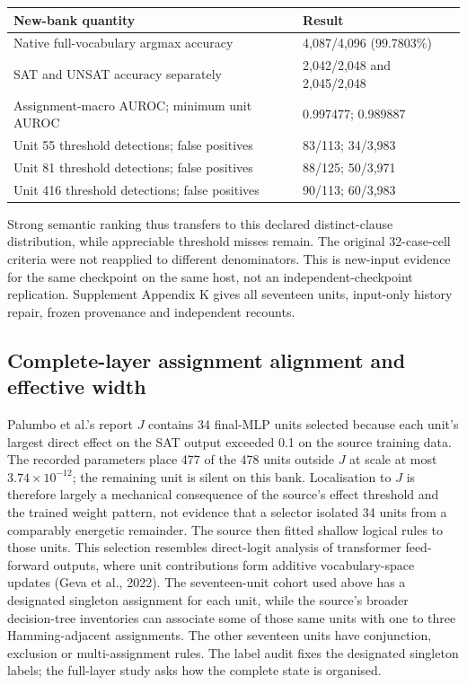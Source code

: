 \documentclass[
  british,
  11pt,
  a4paper,
]{article}
\newcounter{none} %
\begin{document}
{\def\LTcaptype{none} %
\begin{longtable}[]{@{}ll@{}}
\toprule\noalign{}
New-bank quantity & Result \\
\midrule\noalign{}
\endhead
\bottomrule\noalign{}
\endlastfoot
Native full-vocabulary argmax accuracy & 4,087/4,096 (99.7803\%) \\
SAT and UNSAT accuracy separately & 2,042/2,048 and 2,045/2,048 \\
Assignment-macro AUROC; minimum unit AUROC & 0.997477; 0.989887 \\
Unit 55 threshold detections; false positives & 83/113; 34/3,983 \\
Unit 81 threshold detections; false positives & 88/125; 50/3,971 \\
Unit 416 threshold detections; false positives & 90/113; 60/3,983 \\
\end{longtable}
}

Strong semantic ranking thus transfers to this declared distinct-clause
distribution, while appreciable threshold misses remain. The original
32-case-cell criteria were not reapplied to different denominators. This
is new-input evidence for the same checkpoint on the same host, not an
independent-checkpoint replication. Supplement Appendix K gives all
seventeen units, input-only history repair, frozen provenance and
independent recounts.

\subsection{Complete-layer assignment alignment and effective
width}\label{complete-layer-assignment-alignment-and-effective-width}

Palumbo et al.'s report \(J\) contains 34 final-MLP units selected
because each unit's largest direct effect on the SAT output exceeded 0.1
on the source training data. The recorded parameters place 477 of the
478 units outside \(J\) at scale at most \(3.74\times10^{-12}\); the
remaining unit is silent on this bank. Localisation to \(J\) is
therefore largely a mechanical consequence of the source's effect
threshold and the trained weight pattern, not evidence that a selector
isolated 34 units from a comparably energetic remainder. The source then
fitted shallow logical rules to those units. This selection resembles
direct-logit analysis of transformer feed-forward outputs, where unit
contributions form additive vocabulary-space updates (Geva et al.,
2022). The seventeen-unit cohort used above has a designated singleton
assignment for each unit, while the source's broader decision-tree
inventories can associate some of those same units with one to three
Hamming-adjacent assignments. The other seventeen units have
conjunction, exclusion or multi-assignment rules. The label audit fixes
the designated singleton labels; the full-layer study asks how the
complete state is organised.
\end{document}

